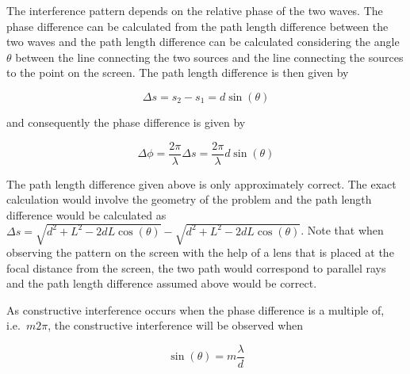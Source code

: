 \documentclass[
  a4paper,
]{book}
\begin{document}
The interference pattern depends on the relative phase of the two waves.
The phase difference can be calculated from the path length difference
between the two waves and the path length difference can be calculated
considering the angle \(\theta\) between the line connecting the two
sources and the line connecting the sources to the point on the screen.
The path length difference is then given by

\[
\Delta s = s_2 - s_1 = d \sin(\theta)
\]

and consequently the phase difference is given by

\[
\Delta \phi = \frac{2\pi}{\lambda} \Delta s = \frac{2\pi}{\lambda} d \sin(\theta)
\]

\begin{tcolorbox}[enhanced jigsaw, coltitle=black, title=\textcolor{quarto-callout-note-color}{\faInfo}\hspace{0.5em}{Correct path length difference}, colframe=quarto-callout-note-color-frame, toprule=.15mm, opacitybacktitle=0.6, left=2mm, opacityback=0, breakable, toptitle=1mm, bottomtitle=1mm, leftrule=.75mm, arc=.35mm, titlerule=0mm, colbacktitle=quarto-callout-note-color!10!white, rightrule=.15mm, bottomrule=.15mm, colback=white]

The path length difference given above is only approximately correct.
The exact calculation would involve the geometry of the problem and the
path length difference would be calculated as
\(\Delta s = \sqrt{d^2 + L^2 - 2dL \cos(\theta)} - \sqrt{d^2 + L^2 - 2dL \cos(\theta)}\).
Note that when observing the pattern on the screen with the help of a
lens that is placed at the focal distance from the screen, the two path
would correspond to parallel rays and the path length difference assumed
above would be correct.

\end{tcolorbox}

As constructive interference occurs when the phase difference is a
multiple of, i.e.~\(m 2\pi\), the constructive interference will be
observed when

\[
\sin(\theta) = m \frac{\lambda}{d}
\]
\end{document}
